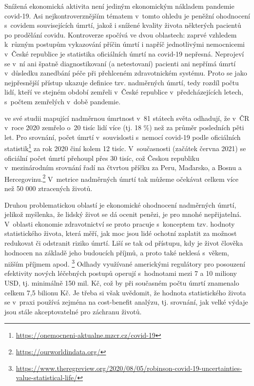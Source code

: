 Snížená ekonomická aktivita není jediným ekonomickým nákladem pandemie covid-19. Asi nejkontroverznějším tématem v~tomto ohledu je peněžní ohodnocení s~covidem souvisejících úmrtí, jakož i snížené kvality života některých pacientů po pro\-dě\-lá\-ní covidu. Kontroverze spočívá ve dvou oblastech: zaprvé vzhledem k~různým postupům vykazování příčin úmrtí i napříč jednotlivými nemocnicemi v~České republice je statistika oficiálních úmrtí na covid-19 nepřesná. Neprojeví se v~ní ani špatně diagnostikovaní (a netestovaní) pacienti ani nepřímá úmrtí v~důsledku zanedbání péče při přehlceném zdravotnickém systému. Proto se jako nejpřesnější přístup ukazuje definice tzv. nadměrných úmrtí, tedy rozdíl počtu lidí, kteří ve stejném období zemřeli v~České republice v~předcházejících letech, s~počtem zemřelých v~době pandemie. 

\cite{karlinsky2021tracking} ve své studii mapující nadměrnou úmrtnost v~81 státech světa odhadují, že v~ČR v~roce 2020 zemřelo o~20 tisíc lidí více (tj. 18 \%) než za průměr posledních pěti let. Pro srovnání, počet úmrtí v~souvislosti s~nemocí covid-19 podle oficiálních statistik\footnote{\url{https://onemocneni-aktualne.mzcr.cz/covid-19}} za rok 2020 činí kolem 12 tisíc. V~současnosti (začátek června 2021) se oficiální počet úmrtí přehoupl přes 30 tisíc, což Českou republiku v~mezinárodním srovnání řadí na čtvrtou příčku za Peru, Maďarsko, a Bosnu a Hercegovinu.\footnote{\url{https://ourworldindata.org/}} V~metrice nadměrných úmrtí tak můžeme očekávat celkem více než 50 000 ztracených životů.

Druhou problematickou oblastí je ekonomické ohodnocení nadměrných úmrtí, jelikož myšlenka, že lidský život se dá ocenit penězi, je pro mnohé nepřijatelná. V~oblasti ekonomie zdravotnictví se proto pracuje s~konceptem tzv. hodnoty statistického života, která měří, jak moc jsou lidé ochotní zaplatit za možnost redukovat či odstranit riziko úmrtí. Liší se tak od přístupu, kdy je život člověka hodnocen na základě jeho budoucích příjmů, a proto také neklesá s~věkem, nižším příjmem apod. \footnote{\url{https://www.theregreview.org/2020/08/05/robinson-covid-19-uncertainties-value-statistical-life/}} Odhady využívané americkými regulátory pro posouzení efektivity nových léčebných postupů operují s~hodnotami mezi 7 a 10 miliony USD, tj. minimálně 150 mil. Kč, což by při současném počtu úmrtí znamenalo celkem 7,5 bilionu Kč. Je třeba si však uvědomit, že hodnota statistického života se v~praxi používá zejména na cost-benefit analýzu, tj. srovnání, jak velké výdaje jsou stále akceptovatelné pro záchranu životů.

